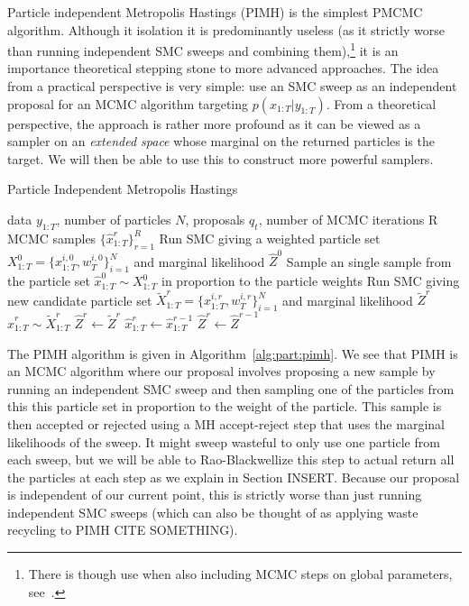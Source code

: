 Particle independent Metropolis Hastings (PIMH) is the simplest PMCMC algorithm.  Although it isolation it is
predominantly useless (as it strictly worse than running independent SMC sweeps and combining 
them),\footnote{There is though use when also including MCMC steps on global parameters, see~\cite{andrieu2010particle}.}
 it is an
importance theoretical stepping stone to more advanced approaches.  The idea from a practical perspective 
is very simple: use an SMC sweep as an independent proposal for an MCMC algorithm targeting $p(x_{1:T}|y_{1:T})$.
From a theoretical perspective, the approach is rather more profound as it can be viewed as a sampler on 
an \emph{extended space} whose marginal on the returned particles is the target.  We will then be able to use
this to construct more powerful samplers.

\begin{algorithm}[tb]
	\caption{Particle Independent Metropolis Hastings}
	\label{alg:part:pimh}
	\begin{spacing}{1.2}
		\begin{algorithmic}[1]
			\renewcommand{\algorithmicrequire}{\textbf{Inputs:}}
			\renewcommand{\algorithmicensure}{\textbf{Outputs:}}				 
			\Require data $y_{1:T}$, number of particles $N$, proposals $q_t$, number of MCMC iterations R
			\Ensure MCMC samples $\{\hat{x}_{1:T}^r\}_{r=1}^R$
			\State Run SMC giving a weighted particle set $X_{1:T}^0 = \{x_{1:T}^{i,0},w_T^{i,0}\}_{i=1}^N$ and marginal likelihood $\hat{Z}^0$
			\State Sample an single sample from the particle set $\hat{x}_{1:T}^0 \sim X_{1:T}^0$ in proportion to the particle weights
			\State Run SMC giving new candidate particle set $\tilde{X}_{1:T}^r = \{x_{1:T}^{i,r},w_T^{i,r}\}_{i=1}^N$
				 and marginal likelihood $\tilde{Z}^r$
			\State $\hat{x}_{1:T}^r \sim \tilde{X}_{1:T}^r$
			\State $\hat{Z}^{r} \leftarrow \tilde{Z}^r$
			\Else
			\State $\hat{x}_{1:T}^r \leftarrow \hat{x}_{1:T}^{r-1}$
			\State $\hat{Z}^{r} \leftarrow \hat{Z}^{r-1}$
			\EndIf
			\EndFor
		\end{algorithmic}
	\end{spacing}
\end{algorithm}

The PIMH algorithm is given in Algorithm~\ref{alg:part:pimh}.  We see that PIMH is an MCMC
algorithm where our proposal involves proposing a new sample by running an independent SMC
sweep and then sampling one of the particles from this this particle set in proportion to
the weight of the particle.  This sample is then accepted or rejected using a MH accept-reject
step that  uses the marginal likelihoods of the sweep.  It might sweep wasteful to only use
one particle from each sweep, but we will be able to Rao-Blackwellize this step to actual
return all the particles at each step as we explain in Section INSERT.  Because our proposal
is independent of our current point, this is strictly worse than just running independent SMC sweeps
(which can also be thought of as applying waste recycling to PIMH CITE SOMETHING).  

